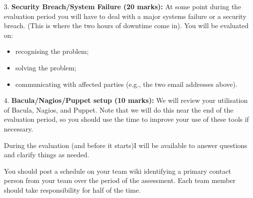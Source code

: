 \documentclass{article}   	%
\begin{document}
3.  \textbf{Security Breach/System Failure (20 marks):}  At some point during the evaluation period you will have to deal with a major systems failure or a security breach.  (This is where the two hours of downtime come in).  You will be evaluated on:

 \begin{itemize}
  \item recognising the problem;
  \item solving the problem;
  \item communicating with affected parties (e.g., the two email addresses above).
\end{itemize}

4.  \textbf{Bacula/Nagios/Puppet setup (10 marks):} We will review your utilisation of Bacula, Nagios, and Puppet.  Note that we will do this near the end of the evaluation period, so you should use the time to improve your use of these tools if necessary.

During the evaluation (and before it starts)I will be available to answer questions and clarify things as needed.

You should post a schedule on your team wiki identifying a primary contact person from your team over the period of the assessment. Each team member should take responsibility for half of the time.
\end{document}
